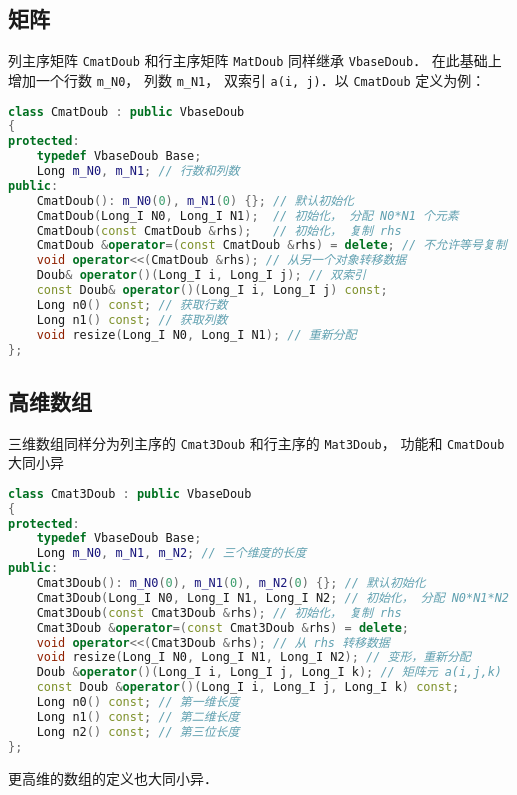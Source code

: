 \subsection{矩阵}
列主序矩阵 \verb|CmatDoub| 和行主序矩阵 \verb|MatDoub| 同样继承 \verb|VbaseDoub|． 在此基础上增加一个行数 \verb|m_N0|， 列数 \verb|m_N1|， 双索引 \verb|a(i, j)|．以 \verb|CmatDoub| 定义为例：
\begin{lstlisting}[language=cpp]
class CmatDoub : public VbaseDoub
{
protected:
    typedef VbaseDoub Base;
    Long m_N0, m_N1; // 行数和列数
public:
    CmatDoub(): m_N0(0), m_N1(0) {}; // 默认初始化
    CmatDoub(Long_I N0, Long_I N1);  // 初始化， 分配 N0*N1 个元素
    CmatDoub(const CmatDoub &rhs);   // 初始化， 复制 rhs
    CmatDoub &operator=(const CmatDoub &rhs) = delete; // 不允许等号复制
    void operator<<(CmatDoub &rhs); // 从另一个对象转移数据
    Doub& operator()(Long_I i, Long_I j); // 双索引
    const Doub& operator()(Long_I i, Long_I j) const;
    Long n0() const; // 获取行数
    Long n1() const; // 获取列数
    void resize(Long_I N0, Long_I N1); // 重新分配
};
\end{lstlisting}

\subsection{高维数组}
三维数组同样分为列主序的 \verb|Cmat3Doub| 和行主序的 \verb|Mat3Doub|， 功能和 \verb|CmatDoub| 大同小异
\begin{lstlisting}[language=cpp]
class Cmat3Doub : public VbaseDoub
{
protected:
    typedef VbaseDoub Base;
    Long m_N0, m_N1, m_N2; // 三个维度的长度
public:
    Cmat3Doub(): m_N0(0), m_N1(0), m_N2(0) {}; // 默认初始化
    Cmat3Doub(Long_I N0, Long_I N1, Long_I N2; // 初始化， 分配 N0*N1*N2 个元素
    Cmat3Doub(const Cmat3Doub &rhs); // 初始化， 复制 rhs
    Cmat3Doub &operator=(const Cmat3Doub &rhs) = delete;
    void operator<<(Cmat3Doub &rhs); // 从 rhs 转移数据
    void resize(Long_I N0, Long_I N1, Long_I N2); // 变形，重新分配
    Doub &operator()(Long_I i, Long_I j, Long_I k); // 矩阵元 a(i,j,k)
    const Doub &operator()(Long_I i, Long_I j, Long_I k) const;
    Long n0() const; // 第一维长度
    Long n1() const; // 第二维长度
    Long n2() const; // 第三位长度
};
\end{lstlisting}

更高维的数组的定义也大同小异．
